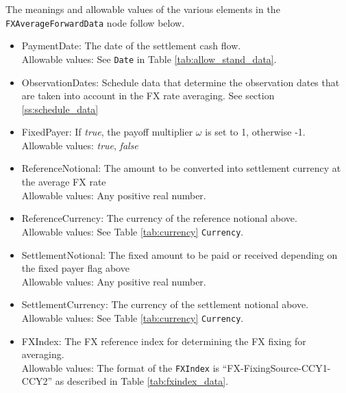 The meanings and allowable values of the various elements in the \lstinline!FXAverageForwardData! node follow below.

\begin{itemize}
\item PaymentDate: The date of the settlement cash flow. \\ Allowable values:  See \lstinline!Date! in Table \ref{tab:allow_stand_data}.
\item ObservationDates: Schedule data that determine the observation dates that are taken into account in the FX rate averaging. See section \ref{ss:schedule_data}
\item FixedPayer: If  \emph{true}, the payoff multiplier $\omega$ is set to 1, otherwise -1.  \\ Allowable values:  \emph{true},  \emph{false}
\item ReferenceNotional: The amount to be converted into settlement currency at the average FX rate \\ Allowable values:  Any positive real number.
\item ReferenceCurrency: The currency of the reference notional above.  \\ Allowable values: See Table \ref{tab:currency}  \lstinline!Currency!.
\item SettlementNotional: The fixed amount to be paid or received depending on the fixed payer flag above \\ Allowable values:  Any positive real number.
\item SettlementCurrency: The currency of the settlement notional above. \\ Allowable values: See Table \ref{tab:currency}  \lstinline!Currency!.
\item FXIndex: The FX reference index for determining the FX fixing for averaging.  \\
Allowable values: The format of the \lstinline!FXIndex! is ``FX-FixingSource-CCY1-CCY2'' as described in Table \ref{tab:fxindex_data}.
\end{itemize}
